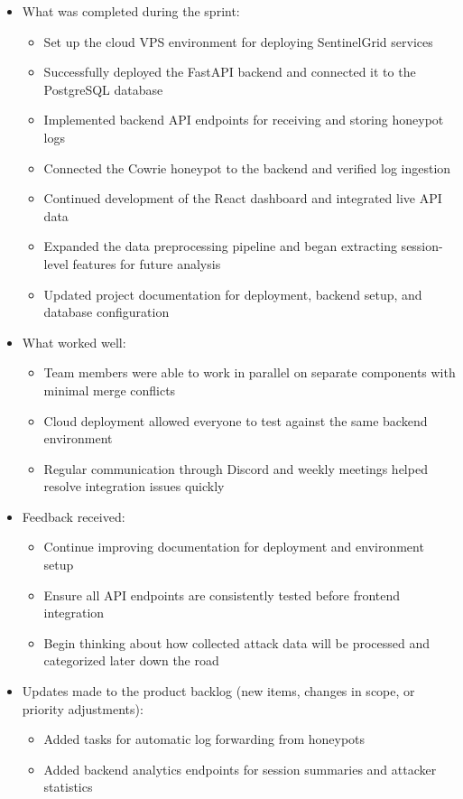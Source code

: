 \documentclass{article}
\begin{document}
\begin{itemize}
    \item What was completed during the sprint:
    \begin{itemize}
        \item Set up the cloud VPS environment for deploying SentinelGrid services
        \item Successfully deployed the FastAPI backend and connected it to the PostgreSQL database
        \item Implemented backend API endpoints for receiving and storing honeypot logs
        \item Connected the Cowrie honeypot to the backend and verified log ingestion
        \item Continued development of the React dashboard and integrated live API data
        \item Expanded the data preprocessing pipeline and began extracting session-level features for future analysis
        \item Updated project documentation for deployment, backend setup, and database configuration
    \end{itemize}

    \item What worked well:
    \begin{itemize}
        \item Team members were able to work in parallel on separate components with minimal merge conflicts
        \item Cloud deployment allowed everyone to test against the same backend environment
        \item Regular communication through Discord and weekly meetings helped resolve integration issues quickly
    \end{itemize}

    \item Feedback received:
    \begin{itemize}
        \item Continue improving documentation for deployment and environment setup
        \item Ensure all API endpoints are consistently tested before frontend integration
        \item Begin thinking about how collected attack data will be processed and categorized later down the road 
    \end{itemize}

    \item Updates made to the product backlog (new items, changes in scope, or priority adjustments):
    \begin{itemize}
        \item Added tasks for automatic log forwarding from honeypots
        \item Added backend analytics endpoints for session summaries and attacker statistics
    \end{itemize}

\end{itemize}
\end{document}
